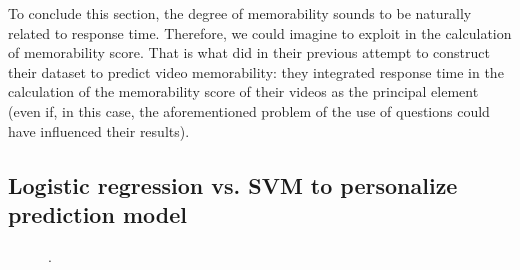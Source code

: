 \documentclass[sigconf]{acmart}
\begin{document}
To conclude this section, the degree of memorability sounds to be naturally related to response time.
Therefore, we could imagine to exploit in the calculation of memorability score.
That is what \cite{shekhar_2017_show} did in their previous attempt to construct their dataset to predict video memorability: they integrated response time in the calculation of the memorability score of their videos as the principal element (even if, in this case, the aforementioned problem of the use of questions could have influenced their results).

\subsection{Logistic regression vs. SVM to personalize prediction model}

\begin{figure}[!htbp]
	\centering
	\caption{\label{fig:logistic_regression}.}
\end{figure}



%




\end{document}
